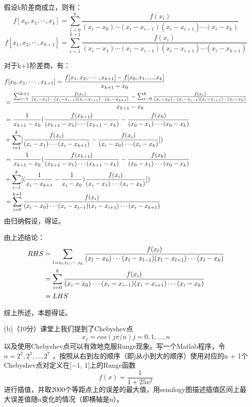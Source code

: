 \documentclass[12pt,a4paper,utf8]{ctexart}
\begin{document}
\begin{enumerate}
假设k阶差商成立，则有：
$$ f[x_0, x_1,\cdots , x_k]=\sum_{i=0}^{k} \frac{f(x_i)}{(x_i-x_0)\cdots (x_{i}-x_{i-1})(x_{i}-x_{i+1})\cdots (x_i-x_k) } $$
$$ f[x_1, x_2,\cdots , x_{k+1}]=\sum_{i=1}^{k+1} \frac{f(x_i)}{(x_i-x_1)\cdots (x_{i}-x_{i-1})(x_{i}-x_{i+1})\cdots (x_i-x_{k+1}) } $$

对于k+1阶差商，有：
\begin{equation}
   \begin{split}
      & f[x_0, x_1,\cdots , x_{k+1}] = \frac{f[x_1, x_2,\cdots , x_{k+1}]-f[x_0, x_1, ..., x_k]}{x_{k+1}-x_0} \\
      & =\frac{\sum_{i=1}^{k+1} \frac{f(x_i)}{(x_i-x_1)\cdots (x_{i}-x_{i-1})(x_{i}-x_{i+1})\cdots (x_i-x_{k+1}) } - \sum_{i=0}^{k} \frac{f(x_i)}{(x_i-x_0)\cdots (x_{i}-x_{i-1})(x_{i}-x_{i+1})\cdots (x_i-x_k) }}{x_{k+1}-x_{0}} \\
      & =\frac{1}{x_{k+1}-x_0} (\frac{f(x_{k+1})}{(x_{k+1}-x_1)\cdots (x_{k+1}-x_k)} - \frac{f(x_{0})}{(x_0-x_1)\cdots (x_0-x_k)}\\
      & +\sum_{i=1}^{k}[\frac{f(x_i)}{(x_i-x_1)\cdots (x_i-x_{k+1}) } - \frac{f(x_i)}{(x_i-x_0)\cdots (x_i-x_k) }])\\
      & = \frac{1}{x_{k+1}-x_0} (\frac{f(x_{k+1})}{(x_{k+1}-x_1)\cdots (x_{k+1}-x_k)} - \frac{f(x_{0})}{(x_0-x_1)\cdots (x_0-x_k)}\\
      & +\sum_{i=1}^{k}[(\frac{1}{x_i-x_{k+1}} - \frac{1}{x_i-x_0})\frac{f(x_i)}{(x_i-x_1)\cdots (x_i-x_{k}) }])\\
      & =\sum_{i=0}^{k+1} \frac{f(x_i)}{(x_i-x_0)\cdots (x_{i}-x_{i-1})(x_{i}-x_{i+1})\cdots (x_i-x_{k+1}) }
      \notag
      \end{split}
   \end{equation}
由归纳假设，得证。

由上述结论：
\begin{equation}
   \begin{split}
      RHS& = \sum_{l=i_0, i_1,\cdots , i_k} \frac{f(x_l)}{(x_l-x_0)\cdots (x_{l}-x_{l-1})(x_{l}-x_{l+1})\cdots (x_l-x_k) } \\
         & = \sum_{i=0}^{k} \frac{f(x_i)}{(x_i-x_0)\cdots (x_{i}-x_{i-1})(x_{i}-x_{i+1})\cdots (x_i-x_k) } \\
         & = LHS
      \notag
      \end{split}
   \end{equation}

综上所述，本题得证。

(b)（10分）课堂上我们提到了Chebyshev点
$$ x_j = cos(jπ/n) j = 0, 1, ..., n $$
以及使用Chebyshev点可以有效地克服Runge现象。写一个Matlab程序，令$ n=2^2,2^3,...,2^7 $ 
，按照从右到左的顺序（即j从小到大的顺序）使用对应的n + 1个Chebyshev点对定义在[−1, 1]上的Runge函数
$$f(x) = \frac{1}{1+25x^2} $$
进行插值，并取2000个等距点上的误差的最大值，用semilogy图描述插值区间上最大误差值随n变化的情况（即横轴是n）。


\end{enumerate}
\end{document}
